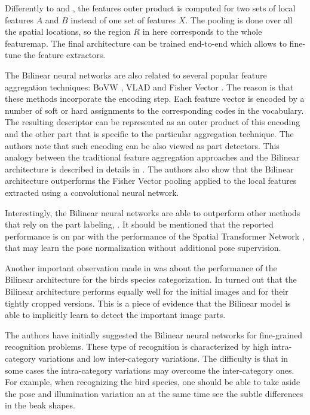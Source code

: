 Differently to \citep{tuzel2008pedestrian} and \citep{carreira2012semantic}, the features outer product is computed for two sets of local features $A$ and $B$ instead of one set of features $X$. The pooling is done over all the spatial locations, so the region $R$ in  here corresponds to the whole featuremap.  The final architecture can be trained end-to-end which allows to fine-tune the feature extractors.

The Bilinear neural networks are also related to several popular feature aggregation techniques: BoVW \citep{csurka2004visual}, VLAD \citep{jegou2010aggregating} and Fisher Vector \citep{Perronnin10}. The reason is that these methods incorporate the encoding step. Each feature vector is encoded by a number of soft or hard assignments to the corresponding codes in the vocabulary. The resulting descriptor can be represented as an outer product of this encoding and the other part that is specific to the particular aggregation technique. The authors note that such encoding can be also viewed as part detectors. This analogy between the traditional feature aggregation approaches and the Bilinear architecture is described in details in  \citep{roychowdhury2015face}. The authors also show that the Bilinear architecture outperforms the Fisher Vector pooling applied to the local features extracted using a convolutional neural network.

Interestingly, the Bilinear neural networks are able to outperform other methods that rely on the part labeling, \eg{} \citep{branson2014bird}. It should be mentioned that the reported performance is on par with the performance of the Spatial Transformer Network \citep{jaderberg2015spatial}, that may learn the pose normalization without additional pose supervision.

Another important observation made in \citep{roychowdhury2015face} was about the performance of the Bilinear architecture for the birds species categorization. In turned out that the Bilinear architecture performs equally well for the initial images and for their tightly cropped versions. This is a piece of  evidence that the Bilinear model is able to implicitly learn to detect the important image parts.

The authors have initially suggested the Bilinear neural networks for fine-grained recognition problems. These type of recognition is characterized by high intra-category variations and low inter-category variations. The difficulty is that in some cases the intra-category variations may overcome the inter-category ones. For example, when recognizing the bird species, one should be able to take aside the pose and illumination variation an at the same time see the subtle differences in the beak shapes. 

